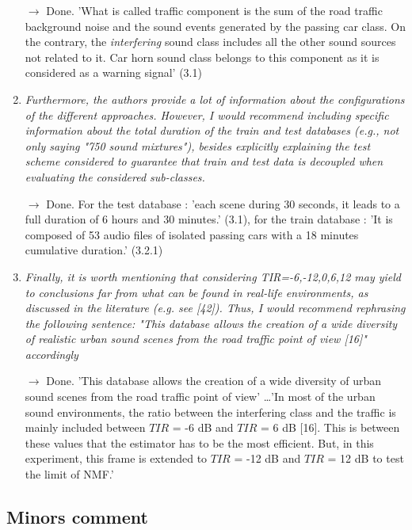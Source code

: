 \documentclass[10pt]{article}
\begin{document}
\begin{enumerate}
$\rightarrow$ Done. 'What is called traffic component is the sum of the road traffic background noise and the sound events generated by the passing car class. On the contrary, the \textit{interfering} sound class includes all the other sound sources not related to it. Car horn sound class belongs to this component as it is considered as a warning signal' (3.1)


\item \emph{Furthermore, the authors provide a lot of information about the configurations of the different approaches. However, I would recommend including specific information about the total duration of the train and test databases (e.g., not only saying "750 sound mixtures"), besides explicitly explaining the test scheme considered to guarantee that train and test data is decoupled when evaluating the considered sub-classes.}

$\rightarrow$ Done. For the test database : 'each scene during 30 seconds, it leads to a full duration of 6 hours and 30 minutes.' (3.1), for the train database : 'It is composed of 53 audio files of isolated passing cars with a 18 minutes cumulative duration.' (3.2.1)


\item \emph{Finally, it is worth mentioning that considering TIR={-6,-12,0,6,12} may yield to conclusions far from what can be found in real-life environments, as discussed in the literature (e.g. see [42]). Thus, I would recommend rephrasing the following sentence: "This database allows the creation of a wide diversity of realistic urban sound scenes from the road traffic point of view [16]" accordingly}

$\rightarrow$ Done. 'This database allows the creation of a wide diversity of urban sound scenes from the road traffic point of view' \dots 'In most of the urban sound environments, the ratio between the interfering class and the traffic is mainly included between $TIR$ = -6 dB and $TIR$ = 6 dB [16]. This is between these values that the estimator has to be the most efficient. But, in this experiment, this frame is extended to $TIR$ = -12 dB and $TIR$ = 12 dB to test the limit of NMF.'


\end{enumerate}

\subsection{Minors comment}
\end{document}
